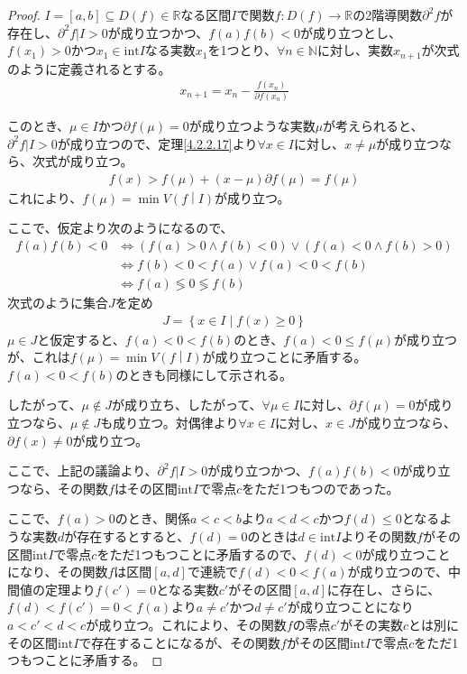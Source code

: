 \documentclass[dvipdfmx]{jsarticle}
\begin{document}
\begin{proof}
$I = [ a,b] \subseteq D(f) \in \mathbb{R}$なる区間$I$で関数$f:D(f) \rightarrow \mathbb{R}$の2階導関数$\partial^{2}f$が存在し、$\partial^{2}f|I > 0$が成り立つかつ、$f(a)f(b) < 0$が成り立つとし、$f\left( x_{1} \right) > 0$かつ$x_{1} \in \mathrm{int}I$なる実数$x_{1}$を1つとり、$\forall n \in \mathbb{N}$に対し、実数$x_{n + 1}$が次式のように定義されるとする。
\begin{align*}
x_{n + 1} = x_{n} - \frac{f\left( x_{n} \right)}{\partial f\left( x_{n} \right)}
\end{align*}\par
このとき、$\mu \in I$かつ$\partial f(\mu) = 0$が成り立つような実数$\mu$が考えられると、$\partial^{2}f|I > 0$が成り立つので、定理\ref{4.2.2.17}より$\forall x \in I$に対し、$x \neq \mu$が成り立つなら、次式が成り立つ。
\begin{align*}
f(x) > f(\mu) + (x - \mu)\partial f(\mu) = f(\mu)
\end{align*}
これにより、$f(\mu) = \min{V\left( f \middle| I \right)}$が成り立つ。\par
ここで、仮定より次のようになるので、
\begin{align*}
f(a)f(b) < 0 &\Leftrightarrow \left( f(a) > 0 \land f(b) < 0 \right) \vee \left( f(a) < 0 \land f(b) > 0 \right)\\
&\Leftrightarrow f(b) < 0 < f(a) \vee f(a) < 0 < f(b)\\
&\Leftrightarrow f(a) \lessgtr 0 \lessgtr f(b)
\end{align*}
次式のように集合$J$を定め
\begin{align*}
J = \left\{ x \in I \middle| f(x) \geq 0 \right\}
\end{align*}
$\mu \in J$と仮定すると、$f(a) < 0 < f(b)$のとき、$f(a) < 0 \leq f(\mu)$が成り立つが、これは$f(\mu) = \min{V\left( f \middle| I \right)}$が成り立つことに矛盾する。$f(a) < 0 < f(b)$のときも同様にして示される。\par
したがって、$\mu \notin J$が成り立ち、したがって、$\forall\mu \in I$に対し、$\partial f(\mu) = 0$が成り立つなら、$\mu \notin J$も成り立つ。対偶律より$\forall x \in I$に対し、$x \in J$が成り立つなら、$\partial f(x) \neq 0$が成り立つ。\par
ここで、上記の議論より、$\partial^{2}f|I > 0$が成り立つかつ、$f(a)f(b) < 0$が成り立つなら、その関数$f$はその区間$\mathrm{int}I$で零点$c$をただ1つもつのであった。\par
ここで、$f(a) > 0$のとき、関係$a < c < b$より$a < d < c$かつ$f(d) \leq 0$となるような実数$d$が存在するとすると、$f(d) = 0$のときは$d \in \mathrm{int}I$よりその関数$f$がその区間$\mathrm{int}I$で零点$c$をただ1つもつことに矛盾するので、$f(d) < 0$が成り立つことになり、その関数$f$は区間$[ a,d]$で連続で$f(d) < 0 < f(a)$が成り立つので、中間値の定理より$f\left( c' \right) = 0$となる実数$c'$がその区間$[ a,d]$に存在し、さらに、$f(d) < f\left( c' \right) = 0 < f(a)$より$a \neq c'$かつ$d \neq c'$が成り立つことになり$a < c' < d < c$が成り立つ。これにより、その関数$f$の零点$c'$がその実数$c$とは別にその区間$\mathrm{int}I$で存在することになるが、その関数$f$がその区間$\mathrm{int}I$で零点$c$をただ1つもつことに矛盾する。\par

\end{proof}
\end{document}
